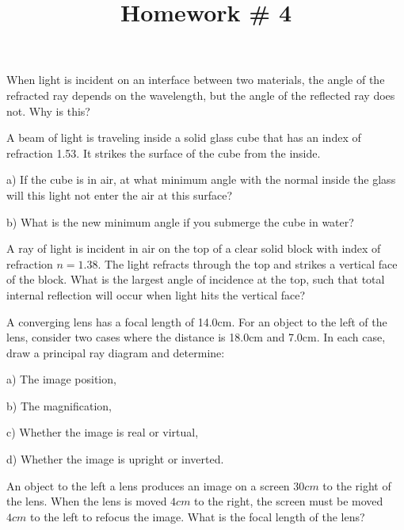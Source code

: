 \documentclass[10pt]{article}
\newenvironment{problem}[2][Problem]{\begin{trivlist}
\item[\hskip \labelsep {\bfseries #1}\hskip \labelsep {\bfseries #2.}]}{\end{trivlist}}
\begin{document}
 \title{Homework \# 4}
\date{}
\maketitle

\begin{problem}{1}
When light is incident on an interface between two materials, the angle of the refracted ray depends on the wavelength, but the angle of the reflected ray does not. Why is this?
\end{problem}


 \begin{problem}{2}
A beam of light is traveling inside a solid glass cube that has an index of refraction 1.53. It strikes the surface of the cube from the inside.
\item a) If the cube is in air, at what minimum angle with the normal inside the glass will this light not enter the air at this surface?
\item b) What is the new minimum angle if you submerge the cube in water?
\end{problem}


\begin{problem}{3}
A ray of light is incident in air on the top of a clear solid block with index of refraction $n=1.38$. The light refracts through the top and strikes a vertical face of the block. What is the largest angle of incidence at the top, such that total internal reflection will occur when light hits the vertical face?
\end{problem}

\begin{problem}{4}
A converging lens has a focal length of 14.0cm. For an object to the left of the lens, consider two cases where the distance is 18.0cm and 7.0cm. In each case, draw a principal ray diagram and determine:
\item a) The image position,
\item b) The magnification,
\item c) Whether the image is real or virtual,
\item d) Whether the image is upright or inverted.
\end{problem}

\begin{problem}{5}
An object to the left a lens produces an image on a screen $30cm$ to the right of the lens. When the lens is moved $4cm$ to the right, the screen must be moved $4cm$ to the left to refocus the image. What is the focal length of the lens?
\end{problem}
\end{document}
